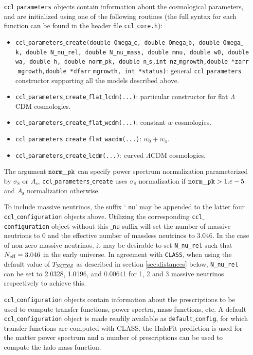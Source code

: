 \documentclass[\docopts]{\docclass}
\begin{document}
{\tt ccl$\_$parameters} objects contain information about the cosmological parameters, and are initialized using one of the following routines (the full syntax for each function can be found in the header file {\tt ccl$\_$core.h}):
\begin{itemize}
 \item {\tt ccl$\_$parameters$\_$create(double Omega$\_$c, double Omega$\_$b, double Omega$\_$k, double N\_nu\_rel, double N\_nu\_mass, double mnu, double w0, double wa, double h, double norm$\_$pk, double n$\_$s,int nz$\_$mgrowth,double *zarr$\_$mgrowth,double *dfarr$\_$mgrowth, int *status)}: general {\tt ccl$\_$parameters} constructor supporting all the models described above.
 \item {\tt ccl$\_$parameters$\_$create$\_$flat$\_$lcdm(...)}: particular constructor for flat $\Lambda$CDM cosmologies.
 \item {\tt ccl$\_$parameters$\_$create$\_$flat$\_$wcdm(...)}: constant $w$ cosmologies.
 \item {\tt ccl$\_$parameters$\_$create$\_$flat$\_$wacdm(...)}: $w_0+w_a$.
 \item {\tt ccl$\_$parameters$\_$create$\_$lcdm(...)}: curved $\Lambda$CDM cosmologies.
\end{itemize}
The argument ${\tt norm\_pk}$ can specify power spectrum normalization parameterized by $\sigma_8$ or $A_\mathrm{s}$, {\tt ccl$\_$parameters$\_$create} uses $\sigma_8$ normalization if ${\tt norm\_pk} > 1.e-5$ and $A_{\mathrm s}$ normalization otherwise.

To include massive neutrinos, the suffix `{\tt $\_$nu}' may be appended to the latter four {\tt ccl$\_$configuration} objects above. Utilizing the corresponding {\tt ccl$\_$configuration} object without this {\tt $\_$nu} suffix will set the number of massive neutrions to 0 and the effective number of massless neutrinos to $3.046$. In the case of non-zero massive neutrinos, it may be desirable to set {\tt N\_nu\_rel} such that $N_{\rm eff}=3.046$ in the early universe. In agreement with {\tt CLASS}, when using the default value of $T_{\rm NCDM}$ as described in section \ref{sec:distances} below, {\tt N\_nu\_rel} can be set to 2.0328, 1.0196, and 0.00641 for 1, 2 and 3 massive neutrinos respectively to achieve this.

{\tt ccl$\_$configuration} objects contain information about the prescriptions to be used to compute transfer functions, power spectra, mass functions, etc. A default {\tt ccl$\_$configuration} object is made readily available as {\tt default$\_$config}, for which transfer functions are computed with CLASS, the HaloFit prediction is used for the matter power spectrum and a number of prescriptions can be used to compute the halo mass function.
\end{document}
